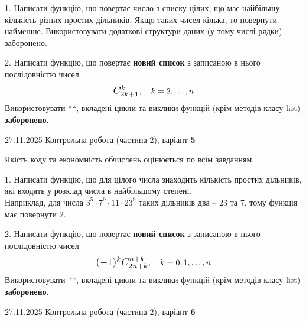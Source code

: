 \documentclass[11pt, ukrainian]{article}
\begin{document}
{{{{\begin {large}
1. Написати функцію, що повертає число з списку цілих, що має найбільшу кількість різних простих дільників. Якщо таких чисел кілька, то повернути найменше. Використовувати додаткові структури даних (у тому числі рядки) заборонено.


2. 
Написати функцію, що повертає \textbf{новий список} з записаною в нього послідовністю чисел
$$\scalebox{1.2}{$C_{2k+1}^{k}$}, \quad k=2,\ldots,n$$
Використовувати **, вкладені цикли та виклики функцій (крім методів класу list) \textbf{заборонено}.

\end{large}
\newpage
{{27.11.2025 Контрольна робота  (частина 2), варіант  \No \textbf { 5 }\par}}


{
\begin {large}
Якість коду та економність обчислень оцінюється по всім завданням.


1. Написати функцію, що для цілого числа знаходить кількість простих дільників, які входять у розклад числа в найбільшому степені. \\ Наприклад, для числа $3^5{\cdot}7^9{\cdot}11{\cdot}23^{9}$ таких дільників два – $23$ та $7$, тому функція має повернути $2$.


2. 
Написати функцію, що повертає \textbf{новий список} з записаною в нього послідовністю чисел
$$\scalebox{1.2}{$(-1)^{k}C_{2n+k}^{n+k}$}, \quad k=0,1,\ldots,n$$
Використовувати **, вкладені цикли та виклики функцій (крім методів класу list) \textbf{заборонено}.

\end{large}
\newpage
{{27.11.2025 Контрольна робота  (частина 2), варіант  \No \textbf { 6 }\par}}


}}}}}
\end{document}
